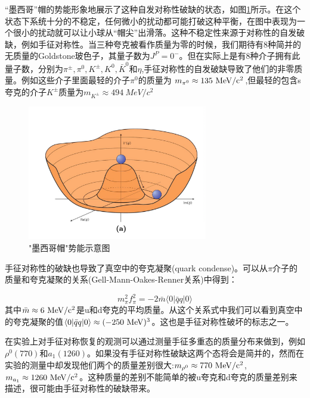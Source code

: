 “墨西哥”帽的势能形象地展示了这种自发对称性破缺的状态，如图\ref{fig:MexHat}所示。在这个状态下系统十分的不稳定，任何微小的扰动都可能打破这种平衡，在图中表现为一个很小的扰动就可以让小球从“帽尖”出滑落。这种不稳定性来源于对称性的自发破缺，例如手征对称性。当三种夸克被看作质量为零的时候，我们期待有8种简并的无质量的Goldstone玻色子，其量子数为$J^P = 0^-$。但在实际上是有8种介子拥有此量子数，分别为$\pi^{\pm},\pi^0,K^{\pm},K^0,\bar{K}^0$和$\eta$,手征对称性的自发破缺导致了他们的非零质量。例如这些介子里面最轻的介子$\pi^0$的质量为 $m_{\pi^0} \approx 135~{\rm MeV/c^2}$,但最轻的包含s夸克的介子$K^{\pm}$质量为$m_{K^{\pm}} \approx 494~MeV/c^2$

\begin{figure}[htb]
    \begin{center}
    \includegraphics[width=0.7\textwidth,clip]{figures/Chapter1/MexHat.png}
    \end{center}
    \caption["墨西哥帽"势能示意图]{"墨西哥帽"势能示意图}
    \label{fig:MexHat}
\end{figure}

手征对称性的破缺也导致了真空中的夸克凝聚(quark condense)。可以从$\pi$介子的质量和夸克凝聚的关系(Gell-Mann-Oakes-Renner关系)中得到：

\begin{equation}
    m_{\pi}^2 f_{\pi}^2 = -2\bar{m}\langle 0|\bar{q}q|0 \rangle
\end{equation}
其中$\bar{m} \approx 6~ {\rm MeV/c^2} $是u和d夸克的平均质量。从这个关系式中我们可以看到真空中的夸克凝聚的值$\langle 0|\bar{q}q|0 \rangle \approx (-250 {\rm~MeV})^3$。这也是手征对称性破坏的标志之一。

在实验上对手征对称恢复的观测可以通过测量手征多重态的质量分布来做到，例如$\rho^0(770)$和$a_1(1260)$。如果没有手征对称性破缺这两个态将会是简并的，然而在实验的测量中却发现他们两个的质量差别很大:$m_{\rho^0} \approx 770 ~{\rm MeV/c^2}$, $m_{a_1} \approx 1260 ~{\rm MeV/c^2}$。这种质量的差别不能简单的被u夸克和d夸克的质量差别来描述，很可能由手征对称性的破缺带来。

